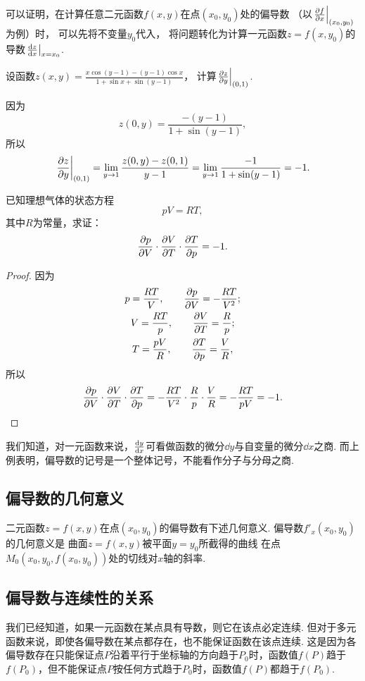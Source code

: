 可以证明，在计算任意二元函数\(f(x,y)\)在点\((x_0,y_0)\)处的偏导数
（以\(\eval{\pdv{f}{x}}_{(x_0,y_0)}\)为例）时，
可以先将不变量\(y_0\)代入，
将问题转化为计算一元函数\(z = f(x, y_0)\)的导数\(\eval{\dv{z}{x}}_{x=x_0}\).

\begin{example}
设函数\(z(x,y) = \frac{x \cos(y-1) - (y-1) \cos x}{1 + \sin x + \sin(y-1)}\)，
计算\(\eval{\pdv{z}{y}}_{(0,1)}\).
\begin{solution}
因为\[
	z(0,y) = \frac{-(y-1)}{1 + \sin(y-1)},
\]
所以\[
	\eval{\pdv{z}{y}}_{(0,1)}
	= \lim_{y\to1} \frac{z(0,y) - z(0,1)}{y - 1}
	= \lim_{y\to1} \frac{-1}{1 + \sin(y-1)}
	= -1.
\]
\end{solution}
\end{example}

\begin{example}
已知理想气体的状态方程\[
	pV = RT,
\]
其中\(R\)为常量，求证：\[
	\pdv{p}{V} \cdot \pdv{V}{T} \cdot \pdv{T}{p} = -1.
\]
\begin{proof}
因为\begin{gather*}
	p = \frac{RT}{V},
	\qquad
	\pdv{p}{V} = -\frac{RT}{V^2}; \\
	V = \frac{RT}{p},
	\qquad
	\pdv{V}{T} = \frac{R}{p}; \\
	T = \frac{pV}{R},
	\qquad
	\pdv{T}{p} = \frac{V}{R},
\end{gather*}
所以\[
	\pdv{p}{V} \cdot \pdv{V}{T} \cdot \pdv{T}{p}
	= -\frac{RT}{V^2} \cdot \frac{R}{p} \cdot \frac{V}{R}
	= -\frac{RT}{pV} = -1.
	\qedhere
\]
\end{proof}
\end{example}

我们知道，对一元函数来说，\(\dv{y}{x}\)可看做函数的微分\(\dd{y}\)与自变量的微分\(\dd{x}\)之商.
而上例表明，偏导数的记号是一个整体记号，不能看作分子与分母之商.

\subsection{偏导数的几何意义}
二元函数\(z=f(x,y)\)在点\((x_0,y_0)\)的偏导数有下述几何意义.
偏导数\(f'_x(x_0,y_0)\)的几何意义是
曲面\(z=f(x,y)\)被平面\(y=y_0\)所截得的曲线
在点\(M_0(x_0,y_0,f(x_0,y_0))\)处的切线对\(x\)轴的斜率.

\subsection{偏导数与连续性的关系}
我们已经知道，如果一元函数在某点具有导数，则它在该点必定连续.
但对于多元函数来说，即使各偏导数在某点都存在，也不能保证函数在该点连续.
这是因为各偏导数存在只能保证点\(P\)沿着平行于坐标轴的方向趋于\(P_0\)时，函数值\(f(P)\)趋于\(f(P_0)\)，但不能保证点\(P\)按任何方式趋于\(P_0\)时，函数值\(f(P)\)都趋于\(f(P_0)\).

